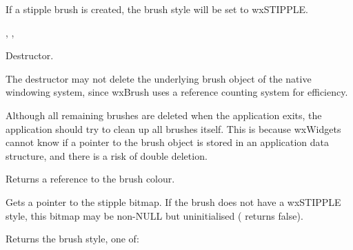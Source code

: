 


If a stipple brush is created, the brush style will be set to wxSTIPPLE.


, , 


\label{wxbrushdtor}


Destructor.


The destructor may not delete the underlying brush object of the native windowing
system, since wxBrush uses a reference counting system for efficiency.

Although all remaining brushes are deleted when the application exits,
the application should try to clean up all brushes itself. This is because
wxWidgets cannot know if a pointer to the brush object is stored in an
application data structure, and there is a risk of double deletion.


\label{wxbrushgetcolour}


Returns a reference to the brush colour.




\label{wxbrushgetstipple}


Gets a pointer to the stipple bitmap. If the brush does not have a wxSTIPPLE style,
this bitmap may be non-NULL but uninitialised ( returns false).




\label{wxbrushgetstyle}


Returns the brush style, one of:

